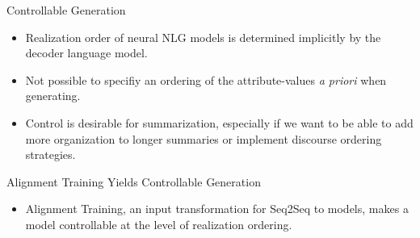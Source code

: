\begin{frame}{Controllable Generation}
\begin{itemize}
\item Realization order of neural NLG models is determined implicitly by the decoder
language model. 
\item Not possible to specifiy an ordering of the attribute-values
\textit{a priori} when generating.

\item Control is desirable for summarization, especially if we want to be able
to add more organization to longer summaries or implement discourse ordering
strategies.

\end{itemize}

\end{frame}



\begin{frame}{Alignment Training Yields Controllable Generation}

\begin{itemize}
    \item Alignment Training, an input transformation for Seq2Seq to models,
    makes a model controllable at the level of
    realization ordering.

\end{itemize}
\end{frame}

%

